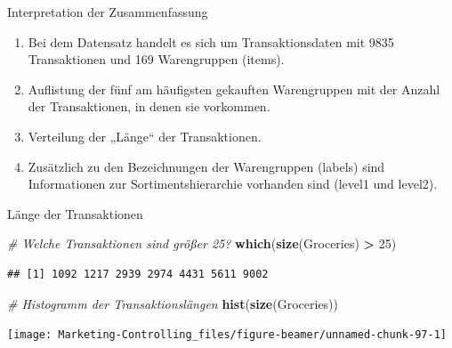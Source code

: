 \documentclass[12pt,ngerman,a4paper,ignorenonframetext,]{beamer}
\newenvironment{Shaded}{\begin{snugshade}}{\end{snugshade}}
\newcommand{\CommentTok}[1]{\textcolor[rgb]{0.56,0.35,0.01}{\textit{#1}}}
\newcommand{\DecValTok}[1]{\textcolor[rgb]{0.00,0.00,0.81}{#1}}
\newcommand{\KeywordTok}[1]{\textcolor[rgb]{0.13,0.29,0.53}{\textbf{#1}}}
\newcommand{\NormalTok}[1]{#1}
\newcommand{\OperatorTok}[1]{\textcolor[rgb]{0.81,0.36,0.00}{\textbf{#1}}}
\newcommand{\StringTok}[1]{\textcolor[rgb]{0.31,0.60,0.02}{#1}}
\begin{document}
\begin{frame}{Interpretation der Zusammenfassung}
\protect\hypertarget{interpretation-der-zusammenfassung}{}

\begin{enumerate}
\item
  Bei dem Datensatz handelt es sich um Transaktionsdaten mit 9835
  Transaktionen und 169 Warengruppen (items).
\item
  Auflistung der fünf am häufigsten gekauften Warengruppen mit der
  Anzahl der Transaktionen, in denen sie vorkommen.
\item
  Verteilung der „Länge`` der Transaktionen.
\item
  Zusätzlich zu den Bezeichnungen der Warengruppen (labels) sind
  Informationen zur Sortimentshierarchie vorhanden sind (level1 und
  level2).
\end{enumerate}

\end{frame}

\begin{frame}{Länge der Transaktionen}
\protect\hypertarget{lange-der-transaktionen}{}

\begin{Shaded}
\begin{Highlighting}[]
\CommentTok{# Welche Transaktionen sind größer 25?}
\KeywordTok{which}\NormalTok{(}\KeywordTok{size}\NormalTok{(Groceries) }\OperatorTok{>}\StringTok{ }\DecValTok{25}\NormalTok{)}
\end{Highlighting}
\end{Shaded}

\begin{verbatim}
## [1] 1092 1217 2939 2974 4431 5611 9002
\end{verbatim}

\begin{Shaded}
\begin{Highlighting}[]
\CommentTok{# Histogramm der Transaktionslängen}
\KeywordTok{hist}\NormalTok{(}\KeywordTok{size}\NormalTok{(Groceries))}
\end{Highlighting}
\end{Shaded}

\begin{center}\texttt{[image: Marketing-Controlling\_files/figure-beamer/unnamed-chunk-97-1]} \end{center}

\end{frame}
\end{document}
